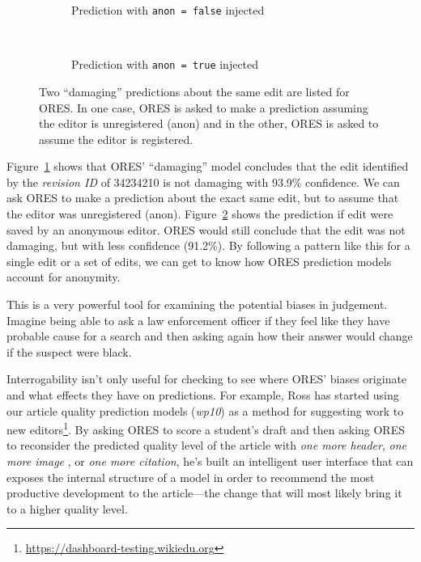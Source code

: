\begin{figure}[h]
\centering
\begin{subfigure}[t]{.5\textwidth}
  \caption{Prediction with \texttt{anon = false} injected}
  \label{fig:anon_injection_false}
\end{subfigure}~~
\begin{subfigure}[t]{.5\textwidth}
  \caption{Prediction with \texttt{anon = true} injected}
  \label{fig:anon_injection_true}
\end{subfigure}
\caption{Two ``damaging'' predictions about the same edit are listed for ORES.  In one case, ORES is asked to make a prediction assuming the editor is unregistered (anon) and in the other, ORES is asked to assume the editor is registered.}
\label{fig:anon_injection}
\end{figure}

Figure~\ref{fig:anon_injection_false} shows that ORES' ``damaging'' model concludes that the edit identified by the \emph{revision ID} of 34234210 is not damaging with 93.9\% confidence.  We can ask ORES to make a prediction about the exact same edit, but to assume that the editor was unregistered (anon). Figure~\ref{fig:anon_injection_true} shows the prediction if edit were saved by an anonymous editor.  ORES would still conclude that the edit was not damaging, but with less confidence (91.2\%).  By following a pattern like this for a single edit or a set of edits, we can get to know how ORES prediction models account for anonymity.

This is a very powerful tool for examining the potential biases in judgement.  Imagine being able to ask a law enforcement officer if they feel like they have probable cause for a search and then asking again how their answer would change if the suspect were black.

Interrogability isn't only useful for checking to see where ORES' biases originate and what effects they have on predictions.  For example, Ross has started using our article quality prediction models (\emph{wp10}) as a method for suggesting work to new editors\footnote{\url{https://dashboard-testing.wikiedu.org}}.  By asking ORES to score a student's draft and then asking ORES to reconsider the predicted quality level of the article with \emph{one more header}, \emph{one more image} , or \emph{one more citation}, he's built an intelligent user interface that can exposes the internal structure of a model in order to recommend the most productive development to the article---the change that will most likely bring it to a higher quality level.
